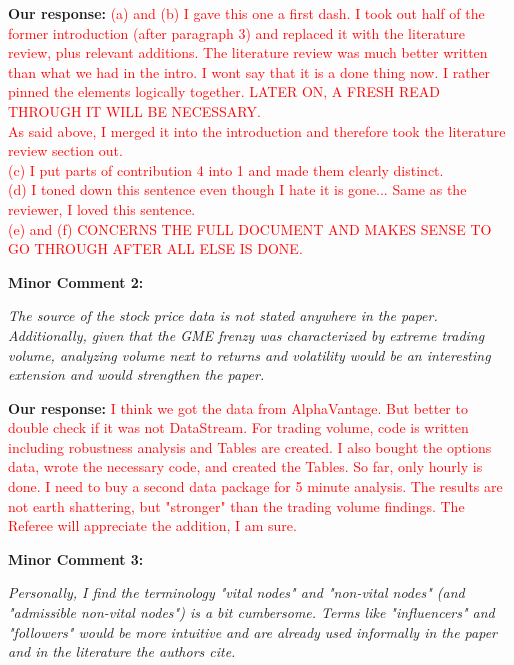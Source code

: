 \documentclass[11pt]{article}
\newcommand{\reviewercomment}[1]{\begin{commentbox}\textit{#1}\end{commentbox}}
\newcommand{\ourresponse}[1]{\textbf{Our response:} #1}
\begin{document}
\ourresponse{
	\textcolor{red}{(a) and (b) I gave this one a first dash. I took out half of the former introduction (after paragraph 3) and replaced it with the literature review, plus relevant additions. The literature review was much better written than what we had in the intro. I wont say that it is a done thing now. I rather pinned the elements logically together. LATER ON, A FRESH READ THROUGH IT WILL BE NECESSARY.} \\
	\textcolor{red}{As said above, I merged it into the introduction and therefore took the literature review section out.} \\
	\textcolor{red}{(c) I put parts of contribution 4 into 1 and made them clearly distinct.} \\
	\textcolor{red}{(d) I toned down this sentence even though I hate it is gone... Same as the reviewer, I loved this sentence. } \\
	\textcolor{red}{(e) and (f) CONCERNS THE FULL DOCUMENT AND MAKES SENSE TO GO THROUGH AFTER ALL ELSE IS DONE.}
}

\bigskip

\textbf{Minor Comment 2:}

\reviewercomment{%
	The source of the stock price data is not stated anywhere in the paper. Additionally, given that the GME frenzy was characterized by extreme trading volume, analyzing volume next to returns and volatility would be an interesting extension and would strengthen the paper.
}

\ourresponse{
	\textcolor{red}{I think we got the data from AlphaVantage. But better to double check if it was not DataStream. For trading volume, code is written including robustness analysis and Tables are created. I also bought the options data, wrote the necessary code, and created the Tables. So far, only hourly is done. I need to buy a second data package for 5 minute analysis. The results are not earth shattering, but "stronger" than the trading volume findings. The Referee will appreciate the addition, I am sure. }
}

\bigskip

\textbf{Minor Comment 3:}

\reviewercomment{%
	Personally, I find the terminology "vital nodes" and "non-vital nodes" (and "admissible non-vital nodes") is a bit cumbersome. Terms like "influencers" and "followers" would be more intuitive and are already used informally in the paper and in the literature the authors cite. 
}
\end{document}
